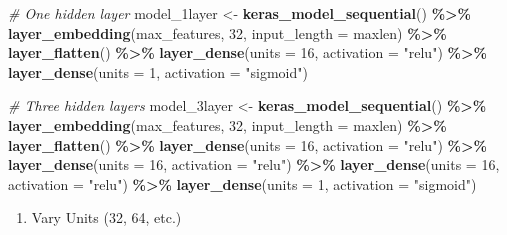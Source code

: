\documentclass[
]{article}
\newenvironment{Shaded}{\begin{snugshade}}{\end{snugshade}}
\newcommand{\AttributeTok}[1]{\textcolor[rgb]{0.13,0.29,0.53}{#1}}
\newcommand{\CommentTok}[1]{\textcolor[rgb]{0.56,0.35,0.01}{\textit{#1}}}
\newcommand{\DecValTok}[1]{\textcolor[rgb]{0.00,0.00,0.81}{#1}}
\newcommand{\FunctionTok}[1]{\textcolor[rgb]{0.13,0.29,0.53}{\textbf{#1}}}
\newcommand{\NormalTok}[1]{#1}
\newcommand{\OtherTok}[1]{\textcolor[rgb]{0.56,0.35,0.01}{#1}}
\newcommand{\SpecialCharTok}[1]{\textcolor[rgb]{0.81,0.36,0.00}{\textbf{#1}}}
\newcommand{\StringTok}[1]{\textcolor[rgb]{0.31,0.60,0.02}{#1}}
\providecommand{\tightlist}{%
  \setlength{\itemsep}{0pt}\setlength{\parskip}{0pt}}
\begin{document}
\begin{Shaded}
\begin{Highlighting}[]
\CommentTok{\# One hidden layer}
\NormalTok{model\_1layer }\OtherTok{\textless{}{-}} \FunctionTok{keras\_model\_sequential}\NormalTok{() }\SpecialCharTok{\%\textgreater{}\%}
  \FunctionTok{layer\_embedding}\NormalTok{(max\_features, }\DecValTok{32}\NormalTok{, }\AttributeTok{input\_length =}\NormalTok{ maxlen) }\SpecialCharTok{\%\textgreater{}\%}
  \FunctionTok{layer\_flatten}\NormalTok{() }\SpecialCharTok{\%\textgreater{}\%}
  \FunctionTok{layer\_dense}\NormalTok{(}\AttributeTok{units =} \DecValTok{16}\NormalTok{, }\AttributeTok{activation =} \StringTok{"relu"}\NormalTok{) }\SpecialCharTok{\%\textgreater{}\%}
  \FunctionTok{layer\_dense}\NormalTok{(}\AttributeTok{units =} \DecValTok{1}\NormalTok{, }\AttributeTok{activation =} \StringTok{"sigmoid"}\NormalTok{)}
\end{Highlighting}
\end{Shaded}

\begin{Shaded}
\begin{Highlighting}[]
\CommentTok{\# Three hidden layers}
\NormalTok{model\_3layer }\OtherTok{\textless{}{-}} \FunctionTok{keras\_model\_sequential}\NormalTok{() }\SpecialCharTok{\%\textgreater{}\%}
  \FunctionTok{layer\_embedding}\NormalTok{(max\_features, }\DecValTok{32}\NormalTok{, }\AttributeTok{input\_length =}\NormalTok{ maxlen) }\SpecialCharTok{\%\textgreater{}\%}
  \FunctionTok{layer\_flatten}\NormalTok{() }\SpecialCharTok{\%\textgreater{}\%}
  \FunctionTok{layer\_dense}\NormalTok{(}\AttributeTok{units =} \DecValTok{16}\NormalTok{, }\AttributeTok{activation =} \StringTok{"relu"}\NormalTok{) }\SpecialCharTok{\%\textgreater{}\%}
  \FunctionTok{layer\_dense}\NormalTok{(}\AttributeTok{units =} \DecValTok{16}\NormalTok{, }\AttributeTok{activation =} \StringTok{"relu"}\NormalTok{) }\SpecialCharTok{\%\textgreater{}\%}
  \FunctionTok{layer\_dense}\NormalTok{(}\AttributeTok{units =} \DecValTok{16}\NormalTok{, }\AttributeTok{activation =} \StringTok{"relu"}\NormalTok{) }\SpecialCharTok{\%\textgreater{}\%}
  \FunctionTok{layer\_dense}\NormalTok{(}\AttributeTok{units =} \DecValTok{1}\NormalTok{, }\AttributeTok{activation =} \StringTok{"sigmoid"}\NormalTok{)}
\end{Highlighting}
\end{Shaded}

\begin{enumerate}
\def\labelenumi{\arabic{enumi}.}
\setcounter{enumi}{1}
\tightlist
\item
  Vary Units (32, 64, etc.)
\end{enumerate}
\end{document}
